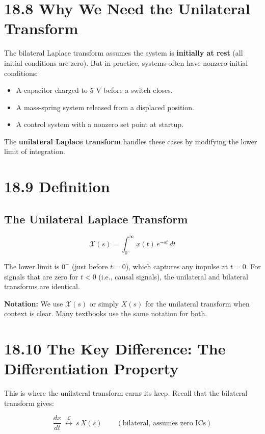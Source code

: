\documentclass[11pt]{article}
\begin{document}
\section*{18.8 Why We Need the Unilateral Transform}

The bilateral Laplace transform assumes the system is \textbf{initially at rest} (all initial conditions are zero). But in practice, systems often have nonzero initial conditions:

\begin{itemize}
  \item A capacitor charged to 5 V before a switch closes.
  \item A mass-spring system released from a displaced position.
  \item A control system with a nonzero set point at startup.
\end{itemize}

The \textbf{unilateral Laplace transform} handles these cases by modifying the lower limit of integration.

\section*{18.9 Definition}

\subsection*{The Unilateral Laplace Transform}

\[\mathcal{X}(s) = \int_{0^-}^{\infty} x(t)\, e^{-st}\, dt\]

The lower limit is $0^-$ (just before $t = 0$), which captures any impulse at $t = 0$. For signals that are zero for $t < 0$ (i.e., causal signals), the unilateral and bilateral transforms are identical.

\textbf{Notation:} We use $\mathcal{X}(s)$ or simply $X(s)$ for the unilateral transform when context is clear. Many textbooks use the same notation for both.

\section*{18.10 The Key Difference: The Differentiation Property}

This is where the unilateral transform earns its keep. Recall that the bilateral transform gives:

\[\frac{dx}{dt} \ \stackrel{\mathcal{L}}{\longleftrightarrow}\ s\, X(s) \qquad (\text{bilateral, assumes zero ICs})\]
\end{document}
